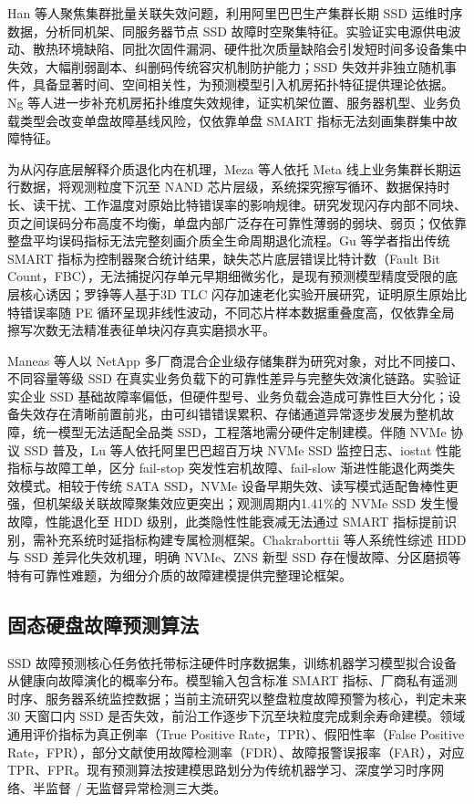 Han 等人聚焦集群批量关联失效问题，利用阿里巴巴生产集群长期 SSD 运维时序数据，分析同机架、同服务器节点 SSD 故障时空聚集特征。实验证实电源供电波动、散热环境缺陷、同批次固件漏洞、硬件批次质量缺陷会引发短时间多设备集中失效，大幅削弱副本、纠删码传统容灾机制防护能力；SSD 失效并非独立随机事件，具备显著时间、空间相关性，为预测模型引入机房拓扑特征提供理论依据\cite{han2021depth}。Ng 等人进一步补充机房拓扑维度失效规律，证实机架位置、服务器机型、业务负载类型会改变单盘故障基线风险，仅依靠单盘 SMART 指标无法刻画集群集中故障特征\cite{ng2026topology}。

为从闪存底层解释介质退化内在机理，Meza 等人依托 Meta 线上业务集群长期运行数据，将观测粒度下沉至 NAND 芯片层级，系统探究擦写循环、数据保持时长、读干扰、工作温度对原始比特错误率的影响规律。研究发现闪存内部不同块、页之间误码分布高度不均衡，单盘内部广泛存在可靠性薄弱的弱块、弱页；仅依靠整盘平均误码指标无法完整刻画介质全生命周期退化流程\cite{meza2015large}。Gu 等学者指出传统 SMART 指标为控制器聚合统计结果，缺失芯片底层错误比特计数（Fault Bit Count，FBC），无法捕捉闪存单元早期细微劣化，是现有预测模型精度受限的底层核心诱因\cite{gu2024exploit}；罗铮等人基于3D TLC 闪存加速老化实验开展研究，证明原生原始比特错误率随 PE 循环呈现非线性波动，不同芯片样本数据重叠度高，仅依靠全局擦写次数无法精准表征单块闪存真实磨损水平\cite{GDGX202406007}。

Maneas 等人以 NetApp 多厂商混合企业级存储集群为研究对象，对比不同接口、不同容量等级 SSD 在真实业务负载下的可靠性差异与完整失效演化链路。实验证实企业 SSD 基础故障率偏低，但硬件型号、业务负载会造成可靠性巨大分化；设备失效存在清晰前置前兆，由可纠错错误累积、存储通道异常逐步发展为整机故障，统一模型无法适配全品类 SSD，工程落地需分硬件定制建模\cite{maneas2020study}。伴随 NVMe 协议 SSD 普及，Lu 等人依托阿里巴巴超百万块 NVMe SSD 监控日志、iostat 性能指标与故障工单，区分 fail-stop 突发性宕机故障、fail-slow 渐进性能退化两类失效模式。相较于传统 SATA SSD，NVMe 设备早期失效、读写模式适配鲁棒性更强，但机架级关联故障聚集效应更突出；观测周期内1.41\%的 NVMe SSD 发生慢故障，性能退化至 HDD 级别，此类隐性性能衰减无法通过 SMART 指标提前识别，需补充系统时延指标构建专属检测框架\cite{lu2022nvme}。Chakraborttii 等人系统性综述 HDD 与 SSD 差异化失效机理，明确 NVMe、ZNS 新型 SSD 存在慢故障、分区磨损等特有可靠性难题，为细分介质的故障建模提供完整理论框架\cite{chakraborttii2026failure}。

\subsection{固态硬盘故障预测算法}
SSD 故障预测核心任务依托带标注硬件时序数据集，训练机器学习模型拟合设备从健康向故障演化的概率分布。模型输入包含标准 SMART 指标、厂商私有遥测时序、服务器系统监控数据；当前主流研究以整盘粒度故障预警为核心，判定未来 30 天窗口内 SSD 是否失效，前沿工作逐步下沉至块粒度完成剩余寿命建模。领域通用评价指标为真正例率（True Positive Rate，TPR）、假阳性率（False Positive Rate，FPR），部分文献使用故障检测率（FDR）、故障报警误报率（FAR），对应 TPR、FPR。现有预测算法按建模思路划分为传统机器学习、深度学习时序网络、半监督 / 无监督异常检测三大类。

